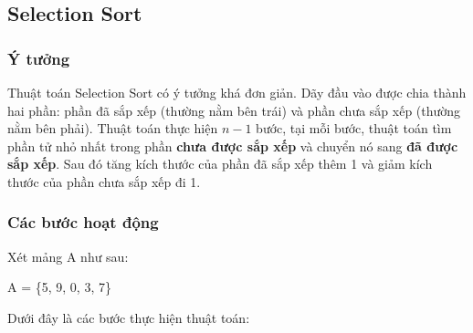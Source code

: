 \subsection{Selection Sort}

\subsubsection{Ý tưởng}

Thuật toán Selection Sort có ý tưởng khá đơn giản. Dãy đầu vào được chia thành hai phần: phần đã sắp xếp (thường nằm bên trái) và phần chưa sắp xếp (thường nằm bên phải). Thuật toán thực hiện $n - 1$ bước, tại mỗi bước, thuật toán tìm phần tử nhỏ nhất trong phần \textbf{chưa được sắp xếp} và chuyển nó sang \textbf{đã được sắp xếp}. Sau đó tăng kích thước của phần đã sắp xếp thêm 1 và giảm kích thước của phần chưa sắp xếp đi 1.

\subsubsection{Các bước hoạt động}
Xét mảng A như sau: 
\begin{center}
   A = \{5, 9, 0, 3, 7\} 
\end{center} 
Dưới đây là các bước thực hiện thuật toán:

